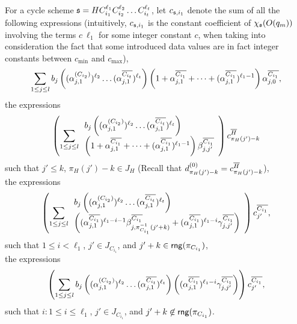 \begin{appendix}
For a cycle scheme ${\mathfrak{s} }=HC_{i_1}^{\ell_1} C_{i_2}^{\ell_2} \dots C_{i_t}^{\ell_t}$, let $c_{{\mathfrak{s} },i_1}$ denote the sum of all the following expressions (intuitively, $c_{{\mathfrak{s} },i_1}$ is the constant coefficient of $\chi_{\mathfrak{s} }(O(q_m))$ involving the terms $ c\ \ell_1$ for some integer constant $c$, when taking into consideration the fact that some introduced data values are in fact integer constants between $c_{\min}$ and $c_{\max}$),
\[
\sum \limits_{1 \le j \le l} 
b_j \left((\alpha^{(C_{i_2})}_{j,1})^{\ell_2} \dots (\alpha^{\overline{C_{i_t}}}_{j,1})^{\ell_t}\right) 
\left(1+\alpha^{\overline{C_{i_1}}}_{j,1} + \dots + (\alpha^{\overline{C_{i_1}}}_{j,1})^{\ell_1-1} \right) \alpha^{\overline{C_{i_1}}}_{j,0},
\]
the expressions 
\[
\left(\sum \limits_{1 \le j \le l} 
\begin{array}{l}
b_j \left((\alpha^{(C_{i_2})}_{j,1})^{\ell_2} \dots (\alpha^{\overline{C_{i_t}}}_{j,1})^{\ell_t}\right) \\
\left(1+\alpha^{\overline{C_{i_1}}}_{j,1} + \dots + (\alpha^{\overline{C_{i_1}}}_{j,1})^{\ell_1-1} \right) \beta^{\overline{C_{i_1}}}_{j,j'}
\end{array}
\right) c^{\overline{H}}_{\pi_H(j')-k}
\]
such that $j' \le k$, $\pi_H(j')-k \in J_H$ (Recall that $d^{(0)}_{\pi_H(j')-k}=c^{\overline{H}}_{\pi_H(j')-k}$), \\
the expressions
\[
\left(\sum \limits_{1 \le j \le l} 
\begin{array}{l}
b_j \left((\alpha^{(C_{i_2})}_{j,1})^{\ell_2} \dots (\alpha^{\overline{C_{i_t}}}_{j,1})^{\ell_t}\right) \\
\left((\alpha^{\overline{C_{i_1}}}_{j,1})^{\ell_1-i-1} \beta^{\overline{C_{i_1}}}_{j,\pi^{-1}_{C_{i_1}}(j'+k)} + (\alpha^{\overline{C_{i_1}}}_{j,1})^{\ell_1-i} \gamma^{\overline{C_{i_1}}}_{j,j'}\right)
\end{array}
\right) c^{\overline{C_{i_1}}}_{j'},
\]
such that $1 \le i < \ell_1$, $j' \in J_{C_{i_1}}$, and $j'+k \in \mathsf{rng}(\pi_{C_{i_1}})$,\\
the expressions
\[
\left(\sum \limits_{1 \le j \le l} 
b_j \left((\alpha^{(C_{i_2})}_{j,1})^{\ell_2} \dots (\alpha^{\overline{C_{i_t}}}_{j,1})^{\ell_t}\right)  \left( (\alpha^{\overline{C_{i_1}}}_{j,1})^{\ell_1-i} \gamma^{\overline{C_{i_1}}}_{j,j'}\right)
\right) c^{\overline{C_{i_1}}}_{j'},
\]
such that $i: 1 \le i \le \ell_1$, $j' \in J_{C_{i_1}}$, and $j'+k \not \in \mathsf{rng}(\pi_{C_{i_1}})$.


\end{appendix}
